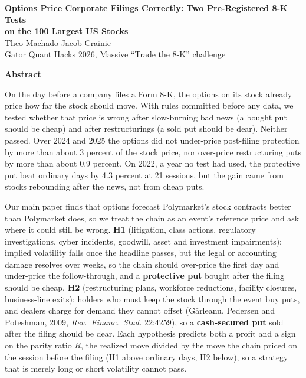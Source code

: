 \documentclass[11pt]{article}
\makeatletter
\renewcommand\section{\@startsection{section}{1}{\z@}{-1.2ex \@plus -.3ex \@minus -.2ex}{0.4ex}{\normalfont\normalsize\bfseries}}
\makeatother
\begin{document}
\begin{center}
{\large\bfseries Options Price Corporate Filings Correctly: Two Pre-Registered 8-K Tests\\ on the 100 Largest US Stocks}\\[0.6ex]
Theo Machado \quad Jacob Crainic\\
Gator Quant Hacks 2026, Massive ``Trade the 8-K'' challenge
\end{center}

\vspace{-0.6ex}
\begin{center}\textbf{Abstract}\end{center}
\vspace{-1.4ex}
{\small On the day before a company files a Form 8-K, the options on its stock already price how far the stock should move. With rules committed before any data, we tested whether that price is wrong after slow-burning bad news (a bought put should be cheap) and after restructurings (a sold put should be dear). Neither passed. Over 2024 and 2025 the options did not under-price post-filing protection by more than about 3 percent of the stock price, nor over-price restructuring puts by more than about 0.9 percent. On 2022, a year no test had used, the protective put beat ordinary days by 4.3 percent at 21 sessions, but the gain came from stocks rebounding after the news, not from cheap puts.}

\section{Hypothesis}
Our main paper finds that options forecast Polymarket's stock contracts better than Polymarket does, so we treat the chain as an event's reference price and ask where it could still be wrong. \textbf{H1} (litigation, class actions, regulatory investigations, cyber incidents, goodwill, asset and investment impairments): implied volatility falls once the headline passes, but the legal or accounting damage resolves over weeks, so the chain should over-price the first day and under-price the follow-through, and a \textbf{protective put} bought after the filing should be cheap. \textbf{H2} (restructuring plans, workforce reductions, facility closures, business-line exits): holders who must keep the stock through the event buy puts, and dealers charge for demand they cannot offset (Gârleanu, Pedersen and Poteshman, 2009, \emph{Rev.\ Financ.\ Stud.} 22:4259), so a \textbf{cash-secured put} sold after the filing should be dear. Each hypothesis predicts both a profit and a sign on the parity ratio $R$, the realized move divided by the move the chain priced on the session before the filing (H1 above ordinary days, H2 below), so a strategy that is merely long or short volatility cannot pass.
\end{document}
